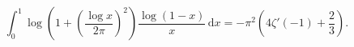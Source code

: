 %

\begin{problem}[pytanie 523027]
    \label{stack_523027}%
    \begin{equation}
        \int_0^1 \log\left(1+\left(\frac{\log x}{2\pi}\right)^2 \right)\frac{\log(1-x)}x \,\mathrm{d} x=-\pi^2\left(4\zeta'(-1)+\frac23\right).
    \end{equation}
\end{problem}

%